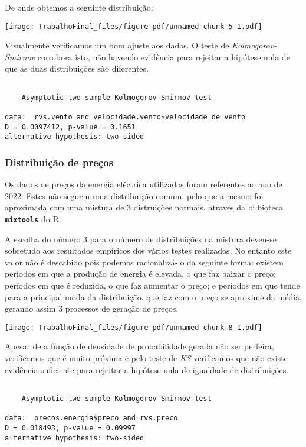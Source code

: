 \documentclass[
  letterpaper,
  DIV=11,
  numbers=noendperiod]{scrartcl}
\begin{document}
De onde obtemos a seguinte distribuição:

\texttt{[image: TrabalhoFinal\_files/figure-pdf/unnamed-chunk-5-1.pdf]}

Visualmente verificamos um bom ajuste aos dados. O teste de
\emph{Kolmogorov-Smirnov} corrobora isto, não havendo evidência para
rejeitar a hipótese nula de que as duas distribuições são diferentes.

\begin{verbatim}

    Asymptotic two-sample Kolmogorov-Smirnov test

data:  rvs.vento and velocidade.vento$velocidade_de_vento
D = 0.0097412, p-value = 0.1651
alternative hypothesis: two-sided
\end{verbatim}

\hypertarget{distribuiuxe7uxe3o-de-preuxe7os}{%
\subsubsection{Distribuição de
preços}\label{distribuiuxe7uxe3o-de-preuxe7os}}

Os dados de preços da energia eléctrica utilizados foram referentes ao
ano de 2022. Estes não seguem uma distribuição comum, pelo que a mesmo
foi aproximada com uma mistura de 3 distruições normais, através da
bilbioteca \textbf{\texttt{mixtools}} do R.

A escolha do número 3 para o número de distribuições na mistura deveu-se
sobretudo aos resultados empíricos dos vários testes realizados. No
entanto este valor não é descabido pois podemos racionalizá-lo da
seguinte forma: existem períodos em que a produção de energia é elevada,
o que faz baixar o preço; períodos em que é reduzida, o que faz aumentar
o preço; e períodos em que tende para a principal moda da distribuição,
que faz com o preço se aproxime da média, gerando assim 3 processos de
geração de preços.

\texttt{[image: TrabalhoFinal\_files/figure-pdf/unnamed-chunk-8-1.pdf]}

Apesar de a função de densidade de probabilidade gerada não ser
perfeira, verificamos que é muito próxima e pelo teste de \emph{KS}
verificamos que não existe evidência suficiente para rejeitar a hipótese
nula de igualdade de distribuições.

\begin{verbatim}

    Asymptotic two-sample Kolmogorov-Smirnov test

data:  precos.energia$preco and rvs.preco
D = 0.018493, p-value = 0.09997
alternative hypothesis: two-sided
\end{verbatim}
\end{document}

